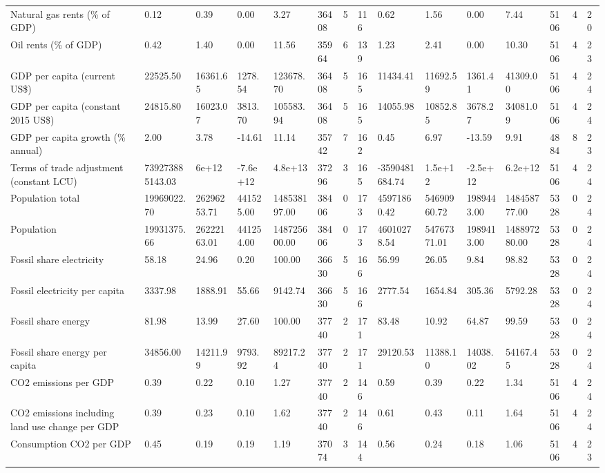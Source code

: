 \begin{longtable}{lllllllllllllll}
Natural gas rents (\% of GDP) & 0.12 & 0.39 & 0.00 & 3.27 & 36408 & 5 & 116 & 0.62 & 1.56 & 0.00 & 7.44 & 5106 & 4 & 20\\
Oil rents (\% of GDP) & 0.42 & 1.40 & 0.00 & 11.56 & 35964 & 6 & 139 & 1.23 & 2.41 & 0.00 & 10.30 & 5106 & 4 & 23\\
GDP per capita (current US\$) & 22525.50 & 16361.65 & 1278.54 & 123678.70 & 36408 & 5 & 165 & 11434.41 & 11692.59 & 1361.41 & 41309.00 & 5106 & 4 & 24\\
GDP per capita (constant 2015 US\$) & 24815.80 & 16023.07 & 3813.70 & 105583.94 & 36408 & 5 & 165 & 14055.98 & 10852.85 & 3678.27 & 34081.09 & 5106 & 4 & 24\\
\addlinespace
GDP per capita growth (\% annual) & 2.00 & 3.78 & -14.61 & 11.14 & 35742 & 7 & 162 & 0.45 & 6.97 & -13.59 & 9.91 & 4884 & 8 & 23\\
Terms of trade adjustment (constant LCU) & 739273885143.03 & 6e+12 & -7.6e+12 & 4.8e+13 & 37296 & 3 & 165 & -3590481684.74 & 1.5e+12 & -2.5e+12 & 6.2e+12 & 5106 & 4 & 24\\
Population total & 19969022.70 & 26296253.71 & 441525.00 & 148538197.00 & 38406 & 0 & 173 & 45971860.42 & 54690960.72 & 1989443.00 & 148458777.00 & 5328 & 0 & 24\\
Population & 19931375.66 & 26222163.01 & 441254.00 & 148725600.00 & 38406 & 0 & 173 & 46010278.54 & 54767371.01 & 1989413.00 & 148897280.00 & 5328 & 0 & 24\\
Fossil share electricity & 58.18 & 24.96 & 0.20 & 100.00 & 36630 & 5 & 166 & 56.99 & 26.05 & 9.84 & 98.82 & 5328 & 0 & 24\\
\addlinespace
Fossil electricity per capita & 3337.98 & 1888.91 & 55.66 & 9142.74 & 36630 & 5 & 166 & 2777.54 & 1654.84 & 305.36 & 5792.28 & 5328 & 0 & 24\\
Fossil share energy & 81.98 & 13.99 & 27.60 & 100.00 & 37740 & 2 & 171 & 83.48 & 10.92 & 64.87 & 99.59 & 5328 & 0 & 24\\
Fossil share energy per capita & 34856.00 & 14211.99 & 9793.92 & 89217.24 & 37740 & 2 & 171 & 29120.53 & 11388.10 & 14038.02 & 54167.45 & 5328 & 0 & 24\\
CO2 emissions per GDP & 0.39 & 0.22 & 0.10 & 1.27 & 37740 & 2 & 146 & 0.59 & 0.39 & 0.22 & 1.34 & 5106 & 4 & 24\\
CO2 emissions including land use change per GDP & 0.39 & 0.23 & 0.10 & 1.62 & 37740 & 2 & 146 & 0.61 & 0.43 & 0.11 & 1.64 & 5106 & 4 & 24\\
\addlinespace
Consumption CO2 per GDP & 0.45 & 0.19 & 0.19 & 1.19 & 37074 & 3 & 144 & 0.56 & 0.24 & 0.18 & 1.06 & 5106 & 4 & 23\\

\end{longtable}
